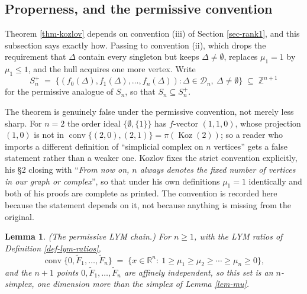 \documentclass[11pt, a4paper, abstract=yes]{scrartcl}
\theoremstyle{definition}
\theoremstyle{remark}
\theoremstyle{plain}
\newtheorem{lemma}[definition]{Lemma}
\newcommand{\Koz}{\operatorname{Koz}}
\newcommand{\proj}{\pi}
\newcommand{\leanpartial}{\tikz[baseline=-0.6ex]{\fill[leanfull] (0,-0.6ex) arc (-90:90:0.6ex) -- cycle;\draw[leanfull,line width=0.5pt] (0,0) circle (0.6ex);}}
\newcommand{\leanmark}[1]{\leavevmode{\reversemarginpar\marginnote{\raggedleft#1}}}
\newcommand{\conv}{\operatorname{conv}}
\begin{document}
\subsection{Properness, and the permissive convention}
\label{sec-permissive}
Theorem \ref{thm-kozlov} depends on convention (iii) of Section \ref{sec-rank1}, and this subsection says
exactly how. Passing to convention (ii), which drops the requirement that \(\Delta\) contain every
singleton but keeps \(\Delta\ne\emptyset\), replaces \(\mu_1=1\) by \(\mu_1\le1\), and the hull
acquires one more vertex. Write
\begin{equation}\label{eq:Splus}
  S_n^{+}\;=\;\bigl\lbrace(f_0(\Delta),f_1(\Delta),\dots,f_n(\Delta)):
    \Delta\in\mathcal D_n,\ \Delta\ne\emptyset\bigr\rbrace\;\subseteq\;\mathbb Z^{n+1}
\end{equation}
for the permissive analogue of \(S_n\), so that \(S_n\subseteq S_n^{+}\).

The theorem is genuinely false under the permissive convention, not merely less sharp. For \(n=2\) the
order ideal \(\lbrace\emptyset,\lbrace1\rbrace\rbrace\) has \(f\)-vector \((1,1,0)\), whose projection
\((1,0)\) is not in \(\conv\lbrace(2,0),(2,1)\rbrace=\proj(\Koz(2))\); so a reader who imports a
different definition of ``simplicial complex on \(n\) vertices'' gets a false statement rather than a
weaker one. Kozlov fixes the strict convention explicitly, his §2 closing with ``\emph{From now on, \(n\)
always denotes the fixed number of vertices in our graph or complex}'', so that under his own
definitions \(\mu_1=1\) identically and both of his proofs are complete as printed. The convention is recorded
here because the statement depends on it, not because anything is missing from the original.

\begin{lemma}
\leanmark{\leanpartial}(\emph{The permissive LYM chain.}) For \(n\ge1\), with the LYM ratios of Definition \ref{def-lym-ratios},
\begin{equation}\label{eq:mu-permissive}
  \conv\lbrace0,\tilde F_1,\dots,\tilde F_n\rbrace
  \;=\;\lbrace x\in\mathbb R^n:\ 1\ge\mu_1\ge\mu_2\ge\cdots\ge\mu_n\ge0\rbrace ,
\end{equation}
and the \(n+1\) points \(0,\tilde F_1,\dots,\tilde F_n\) are affinely independent, so this set is an
\(n\)-simplex, one dimension more than the simplex of Lemma \ref{lem-mu}.
\label{lem:mu-permissive}
\label{lem-mu-permissive}
\end{lemma}
\end{document}
